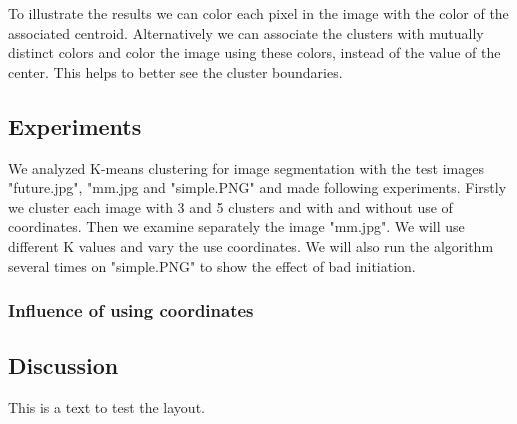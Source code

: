 To illustrate the results we can color each pixel in the image with the color of the associated centroid. Alternatively we can associate the clusters with mutually distinct colors and color the image using these colors, instead of the value of the center. This helps to better see the cluster boundaries.

\subsection{Experiments}

We analyzed K-means clustering for image segmentation with the test images "future.jpg", "mm.jpg and "simple.PNG" and made following experiments. Firstly we cluster each image with 3 and 5 clusters and with and without use of coordinates. Then we examine separately the image "mm.jpg". We will use different K values and vary the use coordinates. We will also run the algorithm several times on "simple.PNG" to show the effect of bad initiation.

\subsubsection{Influence of using coordinates}




\subsection{Discussion}

This is a text to test the layout.

